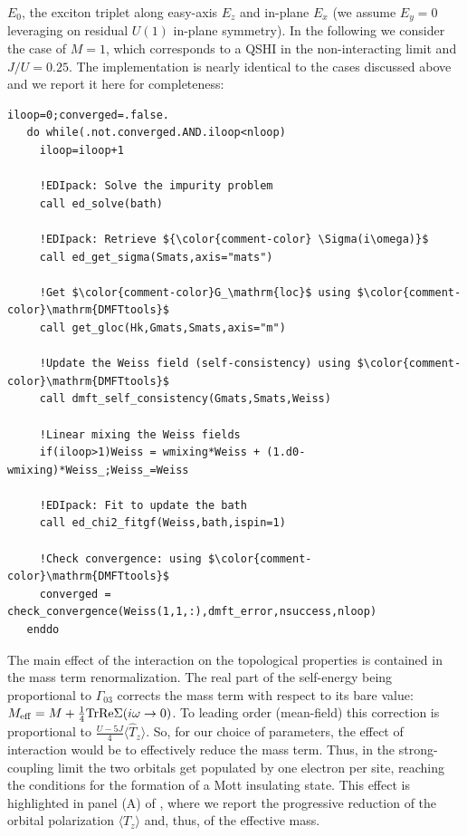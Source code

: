 \documentclass[edipack_sp.tex]{subfiles}
\begin{document}
$E_0$, the exciton triplet along easy-axis $E_z$ and in-plane
$E_x$ (we assume $E_y=0$ leveraging on residual $U(1)$ in-plane symmetry). 
In the following we consider the case of $M=1$, which corresponds to a QSHI in the non-interacting limit and $J/U=0.25$.
The implementation is nearly identical to the cases discussed above and
we report it here for completeness:
\begin{lstlisting}[style=fstyle,numbers=none,basicstyle={\scriptsize\ttfamily}]
   iloop=0;converged=.false.
   do while(.not.converged.AND.iloop<nloop)
     iloop=iloop+1
     
     !EDIpack: Solve the impurity problem
     call ed_solve(bath)

     !EDIpack: Retrieve ${\color{comment-color} \Sigma(i\omega)}$
     call ed_get_sigma(Smats,axis="mats")
     
     !Get $\color{comment-color}G_\mathrm{loc}$ using $\color{comment-color}\mathrm{DMFTtools}$
     call get_gloc(Hk,Gmats,Smats,axis="m")
     
     !Update the Weiss field (self-consistency) using $\color{comment-color}\mathrm{DMFTtools}$
     call dmft_self_consistency(Gmats,Smats,Weiss)

     !Linear mixing the Weiss fields
     if(iloop>1)Weiss = wmixing*Weiss + (1.d0-wmixing)*Weiss_;Weiss_=Weiss

     !EDIpack: Fit to update the bath
     call ed_chi2_fitgf(Weiss,bath,ispin=1)
     
     !Check convergence: using $\color{comment-color}\mathrm{DMFTtools}$
     converged = check_convergence(Weiss(1,1,:),dmft_error,nsuccess,nloop)
   enddo  
 \end{lstlisting}
 
%
The main effect of the interaction on the topological properties is contained in the mass term renormalization.  
The real part of the self-energy being proportional to $\Gamma_{03}$
corrects the mass term with respect to its bare value: $M_\mathrm{eff}=M+\tfrac{1}{4}{\rm Tr}{{\rm Re}\Sigma(i\omega\to0)}$. 
To leading order (mean-field) this correction is proportional to $\tfrac{U-5J}{4}\langle
\hat{T}_z\rangle$. So, for our choice of parameters, the effect of
interaction would be to effectively reduce the mass term. Thus, in the strong-coupling limit the two orbitals get populated by one electron per site, reaching the
conditions for the formation of a Mott insulating state.
This effect is highlighted in panel (A) of , where we report the progressive reduction of the
orbital polarization  $\langle T_z\rangle$ and, thus, of the effective mass. 
\end{document}
